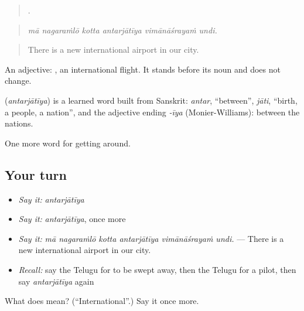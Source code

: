 \begin{quote}
     .
\end{quote}

\begin{quote}
\emph{mā nagaraṁlō kotta antarjātīya vimānāśrayaṁ undi.}
\end{quote}

\begin{quote}
There is a new international airport in our city.
\end{quote}

An adjective:  , an international flight. It stands before its noun and does not change.

\begin{cousinweb}
\textbf{} (\emph{antarjātīya}) is a learned word built from Sanskrit: \emph{antar}, \textquotedblleft{}between\textquotedblright{}, \emph{jāti}, \textquotedblleft{}birth, a people, a nation\textquotedblright{}, and the adjective ending \emph{-īya} (Monier-Williams): between the nations.
\end{cousinweb}

\begin{grammarlens}[title={What you've built}]
One more word for getting around.
\end{grammarlens}

\subsection*{Your turn}
\begin{itemize}
\raggedright
  \item \emph{Say it:} \emph{antarjātīya}
  \item \emph{Say it:} \emph{antarjātīya}, once more
  \item \emph{Say it:} \emph{mā nagaraṁlō kotta antarjātīya vimānāśrayaṁ undi.} — There is a new international airport in our city.
  \item \emph{Recall:} say the Telugu for to be swept away, then the Telugu for a pilot, then say \emph{antarjātīya} again
\end{itemize}

\begin{tcolorbox}[breakable,colback=teal!4,colframe=teal!35!black,title={Before you move on}]
What does  mean? (\textquotedblleft{}International\textquotedblright{}.) Say it once more.
\end{tcolorbox}

